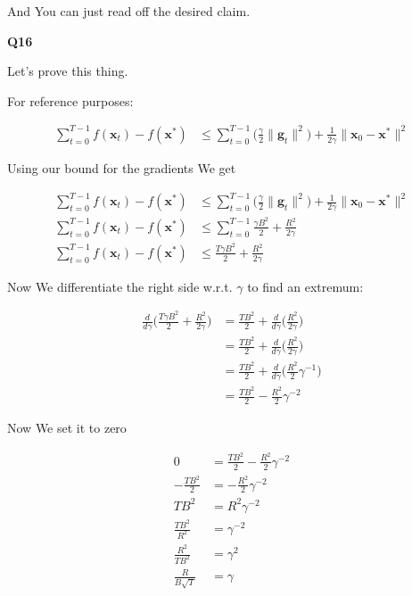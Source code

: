 \documentclass{article}
\begin{document}
		And You can just read off the desired claim.
		
	\textbf{Q16}
	
		Let's prove this thing. 
		
		For reference purposes:
		
		\begin{align*}
			\sum^{T-1}_{t=0}f(\mathbf{x}_t) - f(\mathbf{x}^*) &\le \sum^{T-1}_{t=0} \bigg(  \frac{\gamma}{2} \|\mathbf{g}_t\|^2\bigg) + \frac{1}{2\gamma} \|\mathbf{x}_0 - \mathbf{x}^*\|^2
		\end{align*}
	
		Using our bound for the gradients We get
		
		\begin{align*}
			\sum^{T-1}_{t=0}f(\mathbf{x}_t) - f(\mathbf{x}^*) &\le \sum^{T-1}_{t=0} \bigg(  \frac{\gamma}{2} \|\mathbf{g}_t\|^2\bigg) + \frac{1}{2\gamma} \|\mathbf{x}_0 - \mathbf{x}^*\|^2\\
			\sum^{T-1}_{t=0}f(\mathbf{x}_t) - f(\mathbf{x}^*) &\le \sum^{T-1}_{t=0}  \frac{\gamma B^2}{2}  + \frac{R^2}{2\gamma} \\
			\sum^{T-1}_{t=0}f(\mathbf{x}_t) - f(\mathbf{x}^*) &\le  \frac{T \gamma B^2}{2}  + \frac{R^2}{2\gamma} 
		\end{align*}
		
		Now We differentiate the right side w.r.t. $\gamma$ to find an extremum:
		
		\begin{align*}
			\frac{d}{d\gamma} \bigg(\frac{T \gamma B^2}{2}  + \frac{R^2}{2\gamma}\bigg) &=  \frac{T B^2}{2}  + \frac{d}{d\gamma} \bigg( \frac{R^2}{2\gamma}\bigg)\\
			&=  \frac{T B^2}{2}  + \frac{d}{d\gamma} \bigg( \frac{R^2}{2\gamma}\bigg)\\
			&=  \frac{T B^2}{2}  + \frac{d}{d\gamma} \bigg( \frac{R^2}{2} \gamma^{-1}\bigg)\\
			&=  \frac{T B^2}{2}  - \frac{R^2}{2} \gamma^{-2}
		\end{align*}
		
		Now We set it to zero
		
		\begin{align*}
			0 &=  \frac{T B^2}{2}  - \frac{R^2}{2} \gamma^{-2} \\
			- \frac{T B^2}{2}  &=   - \frac{R^2}{2} \gamma^{-2}\\
			T B^2  &=  R^2 \gamma^{-2}\\
			\frac{T B^2}{R^2}  &= \gamma^{-2}\\
			\frac{R^2}{T B^2}  &= \gamma^{2}\\
			\frac{R}{B\sqrt{T} }  &= \gamma
		\end{align*}
		
\end{document}

